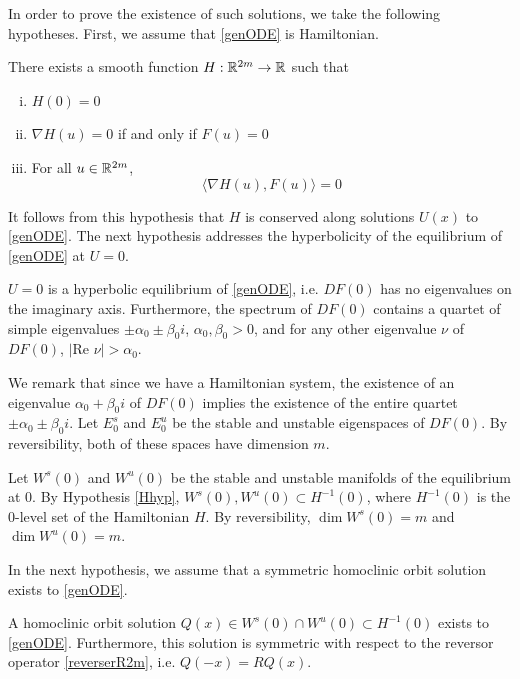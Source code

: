 \documentclass[thesis.tex]{subfiles}
\begin{document}
In order to prove the existence of such solutions, we take the following hypotheses. First, we assume that \eqref{genODE} is Hamiltonian.
\begin{hypothesis}\label{Hhyp}
There exists a smooth function $H: {\mathbb R}^{2m} \rightarrow {\mathbb R}$ such that 
\begin{enumerate}[(i)]
\item $H(0) = 0$
\item $\nabla H(u) = 0$ if and only if $F(u) = 0$
\item For all $u \in {\mathbb R}^{2m}$,
\begin{equation}
\langle \nabla H(u), F(u) \rangle = 0
\end{equation}
\end{enumerate}
\end{hypothesis}
It follows from this hypothesis that $H$ is conserved along solutions $U(x)$ to \eqref{genODE}. The next hypothesis addresses the hyperbolicity of the equilibrium of \eqref{genODE} at $U = 0$.  
\begin{hypothesis}\label{hypeqhyp}
$U = 0$ is a hyperbolic equilibrium of \eqref{genODE}, i.e. $DF(0)$ has no eigenvalues on the imaginary axis. Furthermore, the spectrum of $DF(0)$ contains a quartet of simple eigenvalues $\pm \alpha_0 \pm \beta_0 i$, $\alpha_0, \beta_0 > 0$, and for any other eigenvalue $\nu$ of $DF(0)$, $|\text{Re }\nu| > \alpha_0$.
\end{hypothesis}
We remark that since we have a Hamiltonian system, the existence of an eigenvalue $\alpha_0 + \beta_0 i$ of $DF(0)$ implies the existence of the entire quartet $\pm \alpha_0 \pm \beta_0 i$. Let $E_0^s$ and $E_0^u$ be the stable and unstable eigenspaces of $DF(0)$. By reversibility, both of these spaces have dimension $m$.

Let $W^s(0)$ and $W^u(0)$ be the stable and unstable manifolds of the equilibrium at 0. By Hypothesis \ref{Hhyp}, $W^s(0), W^u(0) \subset H^{-1}(0)$, where $H^{-1}(0)$ is the 0-level set of the Hamiltonian $H$. By reversibility, $\dim W^s(0) = m$ and $\dim W^u(0) = m$. 

In the next hypothesis, we assume that a symmetric homoclinic orbit solution exists to \eqref{genODE}.
\begin{hypothesis}\label{Qexistshyp}
A homoclinic orbit solution $Q(x) \in W^s(0) \cap W^u(0) \subset H^{-1}(0)$ exists to \eqref{genODE}. Furthermore, this solution is symmetric with respect to the reversor operator \eqref{reverserR2m}, i.e. $Q(-x) = R Q(x)$.
\end{hypothesis}
 
\end{document}
